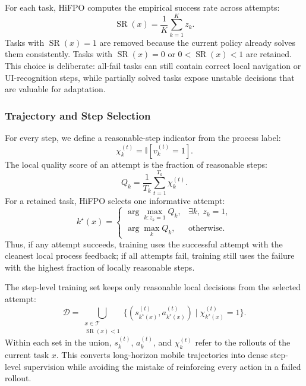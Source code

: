 \documentclass{llmxive}
\providecommand{\hifpo}{HiFPO\xspace}
\begin{document}
For each task, \hifpo computes the empirical success rate across attempts:
\begin{equation}
\label{eq:success-rate}
    \operatorname{SR}(x)=\frac{1}{K}\sum_{k=1}^{K} z_k.
\end{equation}
Tasks with $\operatorname{SR}(x)=1$ are removed because the current policy already solves them consistently. Tasks with $\operatorname{SR}(x)=0$ or $0<\operatorname{SR}(x)<1$ are retained. This choice is deliberate: all-fail tasks can still contain correct local navigation or UI-recognition steps, while partially solved tasks expose unstable decisions that are valuable for adaptation.

\subsubsection{Trajectory and Step Selection}

For every step, we define a reasonable-step indicator from the process label:
\begin{equation}
\label{eq:reasonable-step}
    \chi_k^{(t)}=\mathbb{I}[v_k^{(t)}=1].
\end{equation}
The local quality score of an attempt is the fraction of reasonable steps:
\begin{equation}
\label{eq:quality-score}
    Q_k=\frac{1}{T_k}\sum_{t=1}^{T_k}\chi_k^{(t)}.
\end{equation}
For a retained task, \hifpo selects one informative attempt:
\begin{equation}
\label{eq:attempt-selection}
k^\star(x) =
\begin{cases}
\arg\max_{k:z_k=1} Q_k, & \exists k,\ z_k=1,\\
\arg\max_k Q_k, & \text{otherwise}.
\end{cases}
\end{equation}
Thus, if any attempt succeeds, training uses the successful attempt with the cleanest local process feedback; if all attempts fail, training still uses the failure with the highest fraction of locally reasonable steps.

The step-level training set keeps only reasonable local decisions from the selected attempt:
\begin{equation}
\label{eq:training-set}
    \mathcal{D}=
    \bigcup_{\substack{x\in\mathcal{T}\\ \operatorname{SR}(x)<1}}
    \{(s_{k^\star(x)}^{(t)},a_{k^\star(x)}^{(t)})\mid
    \chi_{k^\star(x)}^{(t)}=1\}.
\end{equation}
Within each set in the union, $s_k^{(t)}$, $a_k^{(t)}$, and $\chi_k^{(t)}$ refer to the rollouts of the current task $x$.
This converts long-horizon mobile trajectories into dense step-level supervision while avoiding the mistake of reinforcing every action in a failed rollout.
\end{document}
